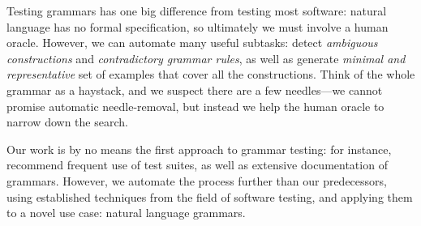 


Testing grammars has one big difference from testing most software: natural
language has no formal specification, so ultimately we must involve a
human oracle. However, we can automate many useful subtasks: detect
\emph{ambiguous constructions} and \emph{contradictory grammar rules},
as well as generate \emph{minimal and representative} set of examples
that cover all the constructions. Think of the whole grammar as a
haystack, and we suspect there are a few needles---we cannot promise
automatic needle-removal, but instead we help the human oracle to
narrow down the search.

Our work is by no means the first approach to grammar testing: for instance, \citet{butt1999lfg} recommend frequent use of test suites, as well as extensive documentation of grammars. However, we automate the process further than our predecessors, using established techniques from the field of software testing, and applying them to a novel use case: natural language grammars.

